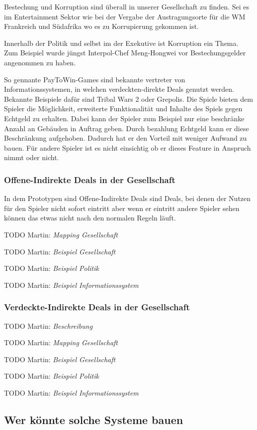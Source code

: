 \documentclass[german]{cgspaper} %
\newcommand{\todo}[1]{\textit{#1}}
\newcommand{\Martin}[1]{\textcolor{colorMartin}{TODO Martin:} \todo{#1} }
\begin{document}
Bestechung und Korruption sind überall in unserer Gesellschaft zu finden.
Sei es im Entertainment Sektor wie bei der Vergabe der Austragungsorte für die WM Frankreich und Südafrika wo es zu Korrupierung gekommen ist. \cite{FAZWM2015}

Innerhalb der Politik und selbst im der Exekutive ist Korruption ein Thema.
Zum Beispiel wurde jüngst Interpol-Chef Meng-Hongwei vor Bestechungsgelder angenommen zu haben. \cite{NTVINTERPOL2018}

So gennante PayToWin-Games sind bekannte vertreter von Informationssystemen, in welchen verdeckten-direkte Deals genutzt werden.
Bekannte Beispiele dafür sind Tribal Wars 2 oder Grepolis.
Die Spiele bieten dem Spieler die Möglichkeit, erweiterte Funktionalität und Inhalte des Spiels gegen Echtgeld zu erhalten.
Dabei kann der Spieler zum Beispiel nur eine beschränke Anzahl an Gebäuden in Auftrag geben.
Durch bezahlung Echtgeld kann er diese Beschränkung aufgehoben.
Dadurch hat er den Vorteil mit weniger Aufwand zu bauen.
Für andere Spieler ist es nicht einsichtig ob er dieses Feature in Anspruch nimmt oder nicht.

\subsubsection{Offene-Indirekte Deals in der Gesellschaft}

In dem Prototypen sind Offene-Indirekte Deals sind Deals, bei denen der Nutzen für den Spieler nicht sofort eintritt aber wenn er eintritt andere Spieler sehen können das etwas nicht nach den normalen Regeln läuft.

\Martin{Mapping Gesellschaft}

\Martin{Beispiel Gesellschaft}

\Martin{Beispiel Politik}

\Martin{Beispiel Informationssystem}

\subsubsection{Verdeckte-Indirekte Deals in der Gesellschaft}

\Martin{Beschreibung}

\Martin{Mapping Gesellschaft}

\Martin{Beispiel Gesellschaft}

\Martin{Beispiel Politik}

\Martin{Beispiel Informationssystem}

\subsection{Wer könnte solche Systeme bauen}
\end{document}
